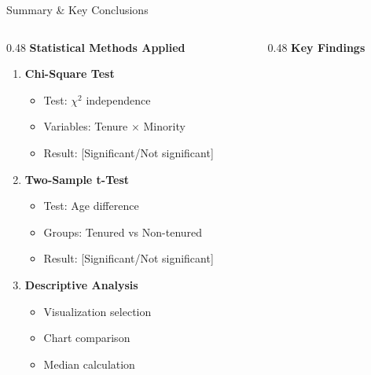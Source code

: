 \documentclass[aspectratio=169]{beamer}
\begin{document}
\begin{frame}{Summary \& Key Conclusions}
    \begin{columns}[T]
        \begin{column}{0.48\textwidth}
            \textbf{Statistical Methods Applied}

            \begin{enumerate}
                \item \textbf{Chi-Square Test}
                    \begin{itemize}
                        \item Test: $\chi^2$ independence
                        \item Variables: Tenure × Minority
                        \item Result: [Significant/Not significant]
                    \end{itemize}

                \vspace{0.2cm}

                \item \textbf{Two-Sample t-Test}
                    \begin{itemize}
                        \item Test: Age difference
                        \item Groups: Tenured vs Non-tenured
                        \item Result: [Significant/Not significant]
                    \end{itemize}

                \vspace{0.2cm}

                \item \textbf{Descriptive Analysis}
                    \begin{itemize}
                        \item Visualization selection
                        \item Chart comparison
                        \item Median calculation
                    \end{itemize}
            \end{enumerate}
        \end{column}

        \begin{column}{0.48\textwidth}
            \textbf{Key Findings}


\end{column}
\end{columns}
\end{frame}
\end{document}
